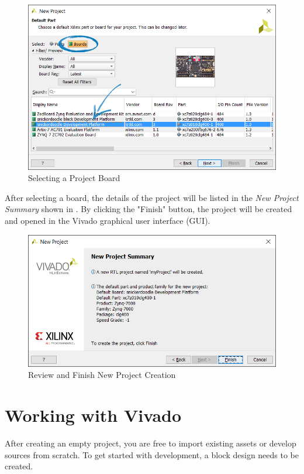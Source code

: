 \begin{figure}
	\centering
	\includegraphics{images/vivado/snickerdoodle_board_select.png}
	\caption{Selecting a Project Board}
	\label{fig:vivadoprojectboard}
\end{figure}


After selecting a board, the details of the project will be listed in the \textit{New Project Summary} shown in . By clicking the "Finish" button, the project will be created and opened in the Vivado graphical user interface (GUI). \\

\begin{figure}
	\centering
	\includegraphics{images/vivado/new_project_summary.png}
	\caption{Review and Finish New Project Creation}
	\label{fig:vivadoprojectfinish}
\end{figure}

\section{Working with Vivado}
After creating an empty project, you are free to import existing assets or develop sources from scratch. To get started with development, a block design needs to be created.



